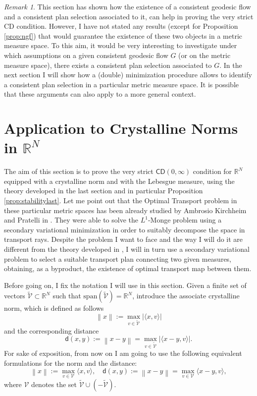 \documentclass[11pt,twoside,a4paper]{article}
\newcommand{\scal}[2]{\ensuremath{\langle #1 , #2 \rangle}} %
\newcommand{\norm}[1]{\left\lVert#1\right\rVert}
\newcommand{\R}{\mathbb{R}}
\newcommand{\CD}{\mathsf{CD}}
\newcommand{\di}{\mathsf d} %
\theoremstyle{theorem}
\theoremstyle{definition}
\theoremstyle{remark}
\newtheorem{remark}[theorem]{Remark}
\theoremstyle{proof}
\begin{document}
\begin{remark}
This section has shown how the existence of a consistent geodesic flow and a consistent plan selection associated to it, can help in proving the very strict CD condition. However, I have not stated any results (except for Proposition \ref{prop:ngf}) that would guarantee the existence of these two objects in a metric measure space. To this aim, it would be very interesting to investigate under which assumptions on a given consistent geodesic flow $G$ (or on the metric measure space), there exists a consistent plan selection associated to $G$. In the next section I will show how a (double) minimization procedure allows to identify a consistent plan selection in a particular metric measure space. It is possible that these arguments can also apply to a more general context.
\end{remark}


\section{Application to Crystalline Norms in $\R^N$}

The aim of this section is to prove the very strict $\CD(0,\infty)$ condition for $\R^N$ equipped with a crystalline norm and with the Lebesgue measure, using the theory developed in the last section and in particular Proposition \ref{prop:stabilitylast}. Let me point out that the Optimal Transport problem in these particular metric spaces has been already studied by Ambrosio Kirchheim and Pratelli in \cite{ambkirpra03}. They were able to solve the $L^1$-Monge problem using a secondary variational minimization in order to suitably decompose the space in transport rays. Despite the problem I want to face and the way I will do it are different from the theory developed in \cite{ambkirpra03}, I will in turn use a secondary variational problem to select a suitable transport plan connecting two given measures, obtaining, as a byproduct, the existence of optimal transport map between them.

Before going on, I fix the notation I will use in this section.
Given a finite set of vectors $\tilde {\mathcal V}\subset \R^N$ such that $\text{span}(\tilde{\mathcal V})=\R^N$, introduce the associate crystalline norm, which is defined as follows
\begin{equation*}
    \norm{x}:= \max_{v\in \tilde{\mathcal{V}}} |\scal{x}{v}|
\end{equation*}
and the corresponding distance 
\begin{equation*}
    \di(x,y):= \norm{x-y}= \max_{v\in \tilde{\mathcal{V}}}|\scal{x-y}{v}|.
\end{equation*}
For sake of exposition, from now on I am going to use the following equivalent formulations for the norm and the distance:
\begin{equation*}
    \norm{x}:= \max_{v\in \mathcal{V}} \scal{x}{v}, \quad \di(x,y):= \norm{x-y}= \max_{v\in \mathcal{V}}\scal{x-y}{v},
\end{equation*}
where $\mathcal V$ denotes the set $\tilde{\mathcal V} \cup (-\tilde{\mathcal V})$. 
\end{document}
